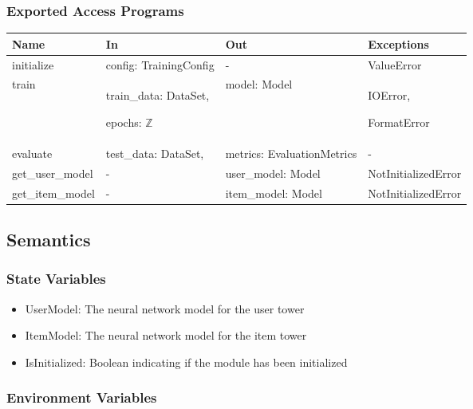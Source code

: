 \documentclass[12pt, titlepage]{article}
\begin{document}
\subsubsection{Exported Access Programs}

\begin{center}
\begin{tabular}{p{3cm} p{4cm} p{4cm} p{2cm}}
\hline
\textbf{Name} & \textbf{In} & \textbf{Out} & \textbf{Exceptions} \\
\hline
initialize & config: TrainingConfig & - & ValueError \\
\hline
train & train\_data: DataSet,

epochs: $\mathbb{Z}$

& model: Model & IOError,

FormatError \\
\hline
evaluate & test\_data: DataSet,

& metrics: EvaluationMetrics & - \\
\hline
get\_user\_model & 

- & user\_model: Model & NotInitializedError \\
\hline
get\_item\_model & 

- & item\_model: Model & NotInitializedError \\
\hline
\end{tabular}
\end{center}

\subsection{Semantics}

\subsubsection{State Variables}
\begin{itemize}
  \item UserModel: The neural network model for the user tower
  \item ItemModel: The neural network model for the item tower
  \item IsInitialized: Boolean indicating if the module has been initialized
\end{itemize}

\subsubsection{Environment Variables}
\end{document}
